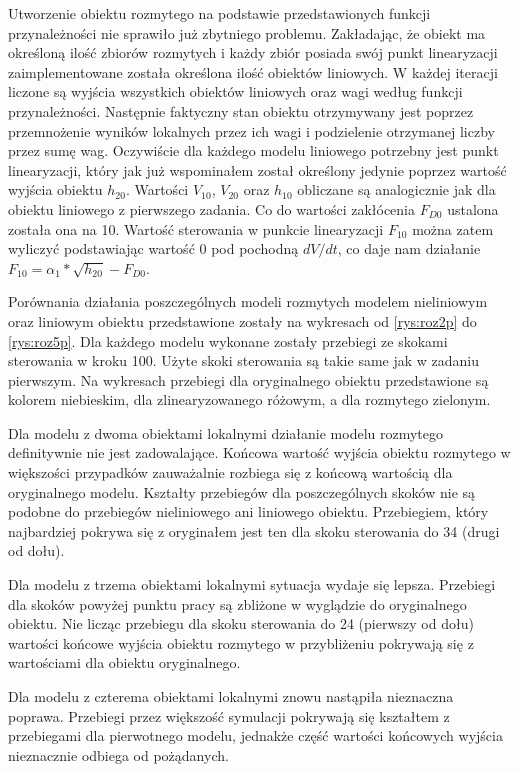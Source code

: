	
		Utworzenie obiektu rozmytego na podstawie przedstawionych funkcji przynależności nie sprawiło już zbytniego problemu. Zakładając, że obiekt ma określoną ilość zbiorów rozmytych i każdy zbiór posiada swój punkt linearyzacji zaimplementowane została określona ilość obiektów liniowych. W każdej iteracji liczone są wyjścia wszystkich obiektów liniowych oraz wagi według funkcji przynależności. Następnie faktyczny stan obiektu otrzymywany jest poprzez przemnożenie wyników lokalnych przez ich wagi i podzielenie otrzymanej liczby przez sumę wag. Oczywiście dla każdego modelu liniowego potrzebny jest punkt linearyzacji, który jak już wspominałem został określony jedynie poprzez wartość wyjścia obiektu $h_{20}$. Wartości $V_{10}$, $V_{20}$ oraz $h_{10}$ obliczane są analogicznie jak dla obiektu liniowego z pierwszego zadania. Co do wartości zakłócenia $F_{D0}$ ustalona została ona na 10. Wartość sterowania w punkcie linearyzacji $F_{10}$ można zatem wyliczyć podstawiając wartość 0 pod pochodną $dV/dt$, co daje nam działanie $F_{10} = \alpha_1*\sqrt{h_{20}}-F_{D0}$.
		
		Porównania działania poszczególnych modeli rozmytych modelem nieliniowym oraz liniowym obiektu przedstawione zostały na wykresach od \ref{rys:roz2p} do \ref{rys:roz5p}. Dla każdego modelu wykonane zostały przebiegi ze skokami sterowania w kroku 100. Użyte skoki sterowania są takie same jak w zadaniu pierwszym. Na wykresach przebiegi dla oryginalnego obiektu przedstawione są kolorem niebieskim, dla zlinearyzowanego różowym, a dla rozmytego zielonym.
		
		Dla modelu z dwoma obiektami lokalnymi działanie modelu rozmytego definitywnie nie jest zadowalające. Końcowa wartość wyjścia obiektu rozmytego w większości przypadków zauważalnie rozbiega się z końcową wartością dla oryginalnego modelu. Kształty przebiegów dla poszczególnych skoków nie są podobne do przebiegów nieliniowego ani liniowego obiektu. Przebiegiem, który najbardziej pokrywa się z oryginałem jest ten dla skoku sterowania do 34 (drugi od dołu).
		
		Dla modelu z trzema obiektami lokalnymi sytuacja wydaje się lepsza. Przebiegi dla skoków powyżej punktu pracy są zbliżone w wyglądzie do oryginalnego obiektu. Nie licząc przebiegu dla skoku sterowania do 24 (pierwszy od dołu) wartości końcowe wyjścia obiektu rozmytego w przybliżeniu pokrywają się z wartościami dla obiektu oryginalnego.
		
		Dla modelu z czterema obiektami lokalnymi znowu nastąpiła nieznaczna poprawa. Przebiegi przez większość symulacji pokrywają się kształtem z przebiegami dla pierwotnego modelu, jednakże część wartości końcowych wyjścia nieznacznie odbiega od pożądanych.

